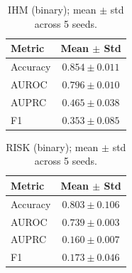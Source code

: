 \begin{table}[h]
\centering
\begin{tabular}{l|c}
\hline
Metric & Mean $\pm$ Std \\
\hline
Accuracy & $0.854 \pm 0.011$ \\
AUROC & $0.796 \pm 0.010$ \\
AUPRC & $0.465 \pm 0.038$ \\
F1 & $0.353 \pm 0.085$ \\
\hline
\end{tabular}
\caption{IHM (binary); mean $\pm$ std across 5 seeds.}
\end{table}

\begin{table}[h]
\centering
\begin{tabular}{l|c}
\hline
Metric & Mean $\pm$ Std \\
\hline
Accuracy & $0.803 \pm 0.106$ \\
AUROC & $0.739 \pm 0.003$ \\
AUPRC & $0.160 \pm 0.007$ \\
F1 & $0.173 \pm 0.046$ \\
\hline
\end{tabular}
\caption{RISK (binary); mean $\pm$ std across 5 seeds.}
\end{table}
